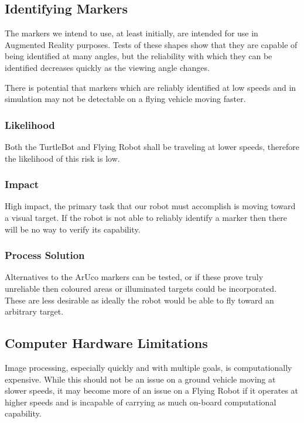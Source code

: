 \documentclass{article}
\begin{document}
	\subsection{Identifying Markers}
	
	The markers we intend to use, at least initially, are intended for use in Augmented Reality purposes. Tests of these shapes show that they are capable of being identified at many angles, but the reliability with which they can be identified decreases quickly as the viewing angle changes. 
	
	There is potential that markers which are reliably identified at low speeds and in simulation may not be detectable on a flying vehicle moving faster.
	
		\subsubsection{Likelihood}
 
		Both the TurtleBot and Flying Robot shall be traveling at lower speeds, therefore the likelihood of this risk is low.
		
		\subsubsection{Impact}
		
		High impact, the primary task that our robot must accomplish is moving toward a visual target. If the robot is not able to reliably identify a marker then there will be no way to verify its capability.
		
		\subsubsection{Process Solution}
		
		Alternatives to the ArUco markers can be tested, or if these prove truly unreliable then coloured areas or illuminated targets could be incorporated. These are less desirable as ideally the robot would be able to fly toward an arbitrary target.
		
	\subsection{Computer Hardware Limitations}
	
	Image processing, especially quickly and with multiple goals, is computationally expensive. While this should not be an issue on a ground vehicle moving at slower speeds, it may become more of an issue on a Flying Robot if it operates at higher speeds and is incapable of carrying as much on-board computational capability.
	
\end{document}
